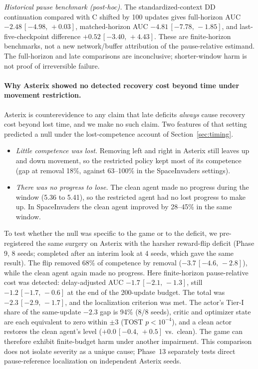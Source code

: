 \documentclass[10pt]{article} %
\newcommand{\ci}[2]{\,[#1,\,#2]}
\begin{document}
\emph{Historical pause benchmark (post-hoc).} The standardized-context DD continuation compared with C shifted by 100 updates gives full-horizon AUC $-2.48\ci{-4.98}{+0.03}$, matched-horizon AUC $-4.81\ci{-7.78}{-1.85}$, and last-five-checkpoint difference $+0.52\ci{-3.40}{+4.43}$. These are finite-horizon benchmarks, not a new network/buffer attribution of the pause-relative estimand. The full-horizon and late comparisons are inconclusive; shorter-window harm is not proof of irreversible failure.



\paragraph{Why Asterix showed no detected recovery cost beyond time under movement restriction.}
Asterix is counterevidence to any claim that late deficits \emph{always} cause recovery cost beyond lost time, and we make no such claim. Two features of that setting predicted a null under the lost-competence account of Section~\ref{sec:timing}.
\begin{itemize}
\item \emph{Little competence was lost.} Removing left and right in Asterix still leaves up and down movement, so the restricted policy kept most of its competence (gap at removal 18\%, against 63--100\% in the SpaceInvaders settings).
\item \emph{There was no progress to lose.} The clean agent made no progress during the window (5.36 to 5.41), so the restricted agent had no lost progress to make up. In SpaceInvaders the clean agent improved by 28--45\% in the same window.
\end{itemize}
To test whether the null was specific to the game or to the deficit, we pre-registered the same surgery on Asterix with the harsher reward-flip deficit (Phase 9, 8 seeds; completed after an interim look at 4 seeds, which gave the same result). The flip removed 68\% of competence by removal ($-3.7\ci{-4.6}{-2.8}$), while the clean agent again made no progress. Here finite-horizon pause-relative cost was detected: delay-adjusted AUC $-1.7\ci{-2.1}{-1.3}$, still $-1.2\ci{-1.7}{-0.6}$ at the end of the 200-update budget. The total was $-2.3\ci{-2.9}{-1.7}$, and the localization criterion was met. The actor's Tier-I share of the same-update $-2.3$ gap is 94\% (8/8 seeds), critic and optimizer state are each equivalent to zero within $\pm3$ (TOST $p<10^{-4}$), and a clean actor restores the clean agent's level ($+0.0\ci{-0.4}{+0.5}$ vs.\ clean). The game can therefore exhibit finite-budget harm under another impairment. This comparison does not isolate severity as a unique cause; Phase~13 separately tests direct pause-reference localization on independent Asterix seeds.
\end{document}
